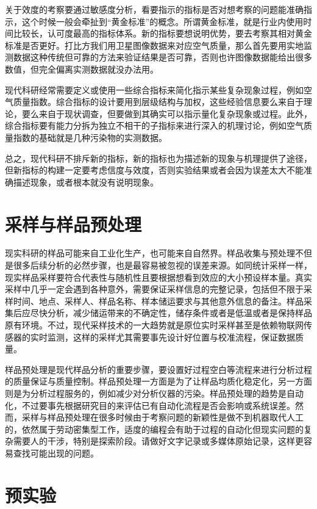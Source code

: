 \documentclass[]{tufte-book}
\begin{document}
关于效度的考察要通过敏感度分析，看要指示的指标是否对想考察的问题能准确指示，这个时候一般会牵扯到``黄金标准''的概念。所谓黄金标准，就是行业内使用时间比较长，认可度最高的指标体系。新的指标要想说明优势，要去考察其相对黄金标准是否更好。打比方我们用卫星图像数据来对应空气质量，那么首先要用实地监测数据这种传统但可靠的方法来验证结果是否可靠，否则也许图像数据能给出很多数值，但完全偏离实测数据就没办法用。

现代科研经常需要定义或使用一些综合指标来简化指示某些复杂现象过程，例如空气质量指数。综合指标的设计要用到层级结构与加权，这些经验信息要么来自于理论，要么来自于现状调查，但要做到其确实可以指示量化复杂现象或过程。此外，综合指标要有能力分拆为独立不相干的子指标来进行深入的机理讨论，例如空气质量指数的基础就是几种污染物的实测数据。

总之，现代科研不排斥新的指标，新的指标也为描述新的现象与机理提供了途径，但新指标的构建一定要考虑信度与效度，否则实验结果或者会因为误差太大不能准确描述现象，或者根本就没有说明现象。

\hypertarget{ux91c7ux6837ux4e0eux6837ux54c1ux9884ux5904ux7406}{%
\section{采样与样品预处理}\label{ux91c7ux6837ux4e0eux6837ux54c1ux9884ux5904ux7406}}

现实科研的样品可能来自工业化生产，也可能来自自然界。样品收集与预处理不但是很多后续分析的必然步骤，也是最容易被忽视的误差来源。如同统计采样一样，现实样品采样要符合代表性与随机性且要根据想看到效应的大小预设样本量。真实采样中几乎一定会遇到各种意外，需要保证采样信息的完整记录，包括但不限于采样时间、地点、采样人、样品名称、样本储运要求与其他意外信息的备注。样品采集后应尽快分析，减少储运带来的不确定性，储存条件或者是低温或者是保持样品原有环境。不过，现代采样技术的一大趋势就是原位实时采样甚至是依赖物联网传感器的实时监测，这样的采样尤其需要事先设计好位置与校准流程，保证数据质量。

样品预处理是现代样品分析的重要步骤，要设置好过程空白等流程来进行分析过程的质量保证与质量控制。样品预处理一方面是为了让样品均质化稳定化，另一方面则是为分析过程服务的，例如减少对分析仪器的污染。样品预处理的趋势是自动化，不过要事先根据研究目的来评估已有自动化流程是否会影响或系统误差。然而，采样与样品预处理在很多时候由于考察问题的新颖性是做不到机器取代人工的，依然属于劳动密集型工作，适度的编程会有助于过程的自动化但现实问题的复杂需要人的干涉，特别是探索阶段。请做好文字记录或多媒体原始记录，这样更容易查找可能出现的问题。

\hypertarget{ux9884ux5b9eux9a8c}{%
\section{预实验}\label{ux9884ux5b9eux9a8c}}
\end{document}
